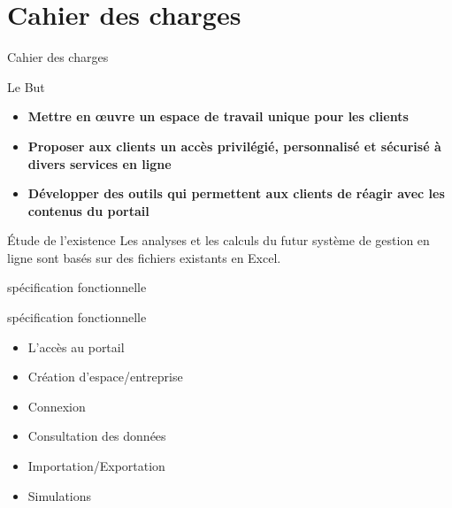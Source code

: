 \documentclass[french]{beamer}
\begin{document}
\section{Cahier des charges}
\begin{frame}{Cahier des charges}
  \begin{block}{Le But}
  \begin{itemize}
\item \textbf{  Mettre en œuvre un espace de travail unique pour les clients}

\item \textbf{ Proposer aux clients un accès privilégié, personnalisé et sécurisé  à divers services en
ligne}
 
\item \textbf{ Développer des outils qui permettent aux clients de réagir avec les contenus du
portail}


\end{itemize}

\end{block}  	
	
	\begin{block}{Étude de l’existence }
	Les analyses et les calculs du futur système de gestion en ligne sont basés
sur des fichiers existants en Excel.
	\end{block}
	
\end{frame}


\begin{frame}{spécification fonctionnelle}

	\begin{exampleblock}{spécification fonctionnelle}
	\begin{itemize}
	
	\item L'accès au portail
	\item Création d’espace/entreprise
	\item Connexion
	\item Consultation des données
	\item Importation/Exportation
	\item Simulations
	
	\end{itemize}

	 \end{exampleblock}
	
	
	
	
	
\end{frame}
\end{document}
